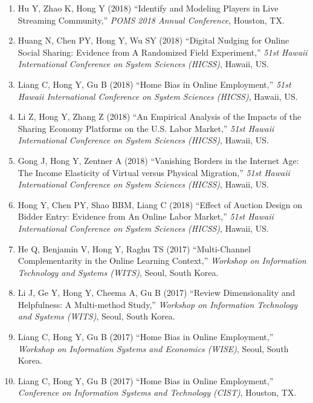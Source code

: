 \documentclass[paper=letter,fontsize=10pt]{scrartcl} %
\newcommand{\ConfEntry}[6]{
		\noindent #1 (#2) ``#3,'' \textit{#4}, #5. \textcolor{blue}{#6}}
\newcommand{\Hong}{Hong Y}
\begin{document}
\begin{enumerate}
\item \ConfEntry{Hu Y, Zhao K, \Hong}{2018}{Identify and Modeling Players in Live Streaming Community}{POMS 2018 Annual Conference}{Houston, TX}{}

\item \ConfEntry{Huang N, Chen PY, \Hong, Wu SY}{2018}{Digital Nudging for Online Social Sharing: Evidence from A Randomized Field Experiment}{51st Hawaii International Conference on System Sciences (HICSS)}{Hawaii, US}{}

\item \ConfEntry{Liang C, \Hong, Gu B}{2018}{Home Bias in Online Employment}{51st Hawaii International Conference on System Sciences (HICSS)}{Hawaii, US}{}

\item \ConfEntry{Li Z, \Hong, Zhang Z}{2018}{An Empirical Analysis of the Impacts of the Sharing Economy Platforms on the U.S. Labor Market}{51st Hawaii International Conference on System Sciences (HICSS)}{Hawaii, US}{}

\item \ConfEntry{Gong J, \Hong, Zentner A}{2018}{Vanishing Borders in the Internet Age: The Income Elasticity of Virtual versus Physical Migration}{51st Hawaii International Conference on System Sciences (HICSS)}{Hawaii, US}{}

\item \ConfEntry{\Hong, Chen PY, Shao BBM, Liang C}{2018}{Effect of Auction Design on Bidder Entry: Evidence from An Online Labor Market}{51st Hawaii International Conference on System Sciences (HICSS)}{Hawaii, US}{}

\item \ConfEntry{He Q, Benjamin V, \Hong, Raghu TS}{2017}{Multi-Channel Complementarity in the Online Learning Context}{Workshop on Information Technology and Systems (WITS)}{Seoul, South Korea}{}

\item \ConfEntry{Li J, Ge Y, \Hong, Cheema A, Gu B}{2017}{Review Dimensionality and Helpfulness: A Multi-method Study}{Workshop on Information Technology and Systems (WITS)}{Seoul, South Korea}{}

\item \ConfEntry{Liang C, \Hong, Gu B}{2017}{Home Bias in Online Employment}{Workshop on Information Systems and Economics (WISE)}{Seoul, South Korea}{}

\item \ConfEntry{Liang C, \Hong, Gu B}{2017}{Home Bias in Online Employment}{Conference on Information Systems and Technology (CIST)}{Houston, TX}{}


\end{enumerate}
\end{document}

